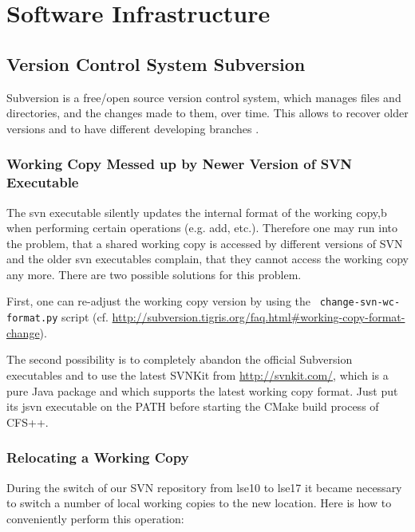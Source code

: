 \chapter{Software Infrastructure} \label{Sec:Infrastructure}

\section{Version Control System Subversion}
\label{sec:svn}

Subversion is a  free/open source version control system,  which manages files
and  directories, and  the changes  made to  them, over  time. This  allows to
recover older versions and to have different developing branches \cite{svn}.

\subsection{Working Copy Messed up by Newer Version of SVN Executable}

The svn executable  silently updates the internal format  of the working copy,b
when performing  certain operations  (e.g. add, etc.).  Therefore one  may run
into the problem, that a shared working copy is accessed by different versions
of SVN  and the older  svn executables complain,  that they cannot  access the
working copy any more.  There are two possible solutions for this problem.

First,  one  can  re-adjust  the  working  copy  version  by  using  the  {\tt
change-svn-wc-format.py}                                                 script
(cf. \url{http://subversion.tigris.org/faq.html#working-copy-format-change}).

The  second  possibility is  to  completely  abandon  the official  Subversion
executables and to use  the latest SVNKit from \url{http://svnkit.com/}, which
is a  pure Java  package and  which supports the  latest working  copy format.
Just  put its  jsvn executable  on the  PATH before  starting the  CMake build
process of CFS++.

\subsection{Relocating a Working Copy}

During  the  switch of  our  SVN  repository from  lse10  to  lse17 it  became
necessary to switch a number of local working copies to the new location. Here
is how to conveniently perform this operation:

